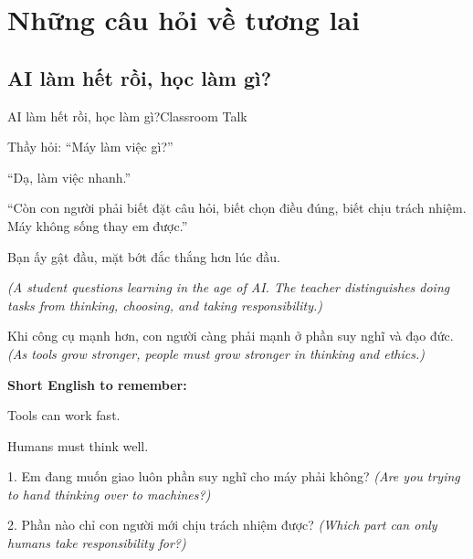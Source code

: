 \chapter{Những câu hỏi về tương lai}

\section{AI làm hết rồi, học làm gì?}
\begin{truyen}{AI làm hết rồi, học làm gì?}{Classroom Talk}

Thầy hỏi: ``Máy làm việc gì?''

``Dạ, làm việc nhanh.''

``Còn con người phải biết đặt câu hỏi, biết chọn điều đúng, biết chịu trách nhiệm. Máy không sống thay em được.''

Bạn ấy gật đầu, mặt bớt đắc thắng hơn lúc đầu.

\textit{(A student questions learning in the age of AI. The teacher distinguishes doing tasks from thinking, choosing, and taking responsibility.)}
\end{truyen}

\begin{baihoc}
Khi công cụ mạnh hơn, con người càng phải mạnh ở phần suy nghĩ và đạo đức.
\textit{(As tools grow stronger, people must grow stronger in thinking and ethics.)}
\end{baihoc}

\begin{ghinhoanh}
\textbf{Short English to remember:}

Tools can work fast.

Humans must think well.
\end{ghinhoanh}

\begin{tuhocnhanh}
1. Em đang muốn giao luôn phần suy nghĩ cho máy phải không? \textit{(Are you trying to hand thinking over to machines?)}

2. Phần nào chỉ con người mới chịu trách nhiệm được? \textit{(Which part can only humans take responsibility for?)}
\end{tuhocnhanh}
\ngancach

